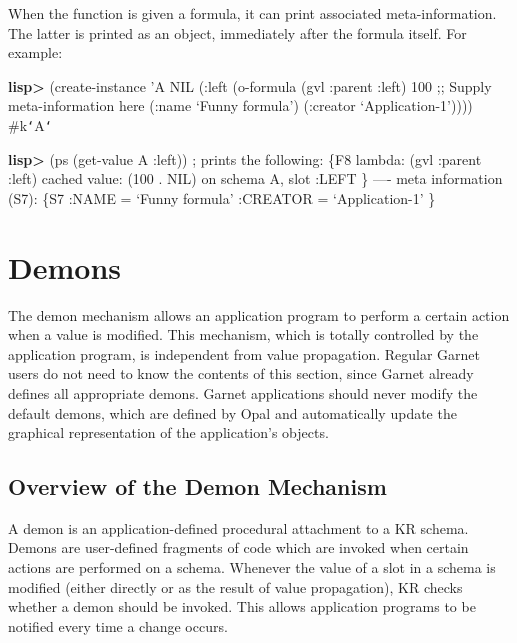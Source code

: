 \begin{group}
When the function  is given a formula, it can print
associated meta-information.  The latter is printed as an
object, immediately after the formula itself.  For example:
\begin{programexample}
{\bf lisp>} (create-instance 'A NIL
        (:left (o-formula (gvl :parent :left) 100
                          ;; Supply meta-information here
                          (:name `Funny formula')
                          (:creator `Application-1'))))
\#k{\tt\char`\<}A{\tt\char`\>}

{\bf lisp>} (ps (get-value A :left))           ; prints the following:
\{F8
  lambda:        (gvl :parent :left)
  cached value:  (100 . NIL)
  on schema A, slot :LEFT
  \}
  ---- meta information (S7):
\{S7
  :NAME =  `Funny formula'
  :CREATOR =  `Application-1'
  \}
\end{programexample}
\end{group}




\section{Demons}
\value{s-top}
\label{demons}

The demon mechanism allows an application program to perform a certain
action when a value is modified.  This mechanism, which is totally
controlled by the application program, is independent from value
propagation.  Regular Garnet users do not need to know the contents of
this section, since Garnet already defines all appropriate demons.
Garnet applications should never modify the default demons, which are
defined by Opal and automatically update the graphical representation
of the application's objects.


\subsection{Overview of the Demon Mechanism}

A demon is an application-defined 
procedural attachment to a KR schema.  Demons are user-defined fragments
of code which are invoked when certain actions are performed on a
schema.  Whenever the value of a slot in a schema is modified (either
directly or as the result of value propagation), KR checks whether a
demon should be invoked.  This allows application programs to
be notified every time a change occurs.

